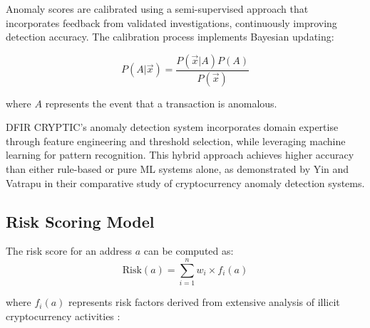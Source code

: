 \documentclass[conference]{IEEEtran}
\begin{document}
Anomaly scores are calibrated using a semi-supervised approach that incorporates feedback from validated investigations, continuously improving detection accuracy. The calibration process implements Bayesian updating:

\begin{equation}
P(A|\vec{x}) = \frac{P(\vec{x}|A)P(A)}{P(\vec{x})}
\end{equation}

where $A$ represents the event that a transaction is anomalous.

DFIR CRYPTIC's anomaly detection system incorporates domain expertise through feature engineering and threshold selection, while leveraging machine learning for pattern recognition. This hybrid approach achieves higher accuracy than either rule-based or pure ML systems alone, as demonstrated by Yin and Vatrapu \cite{yin2019} in their comparative study of cryptocurrency anomaly detection systems.

\subsection{Risk Scoring Model}

The risk score for an address $a$ can be computed as:
\begin{equation}
\text{Risk}(a) = \sum_{i=1}^{n} w_i \times f_i(a)
\end{equation}

where $f_i(a)$ represents risk factors derived from extensive analysis of illicit cryptocurrency activities \cite{paquet2019, bartoletti2018, chainanalysis2022}:
\end{document}

